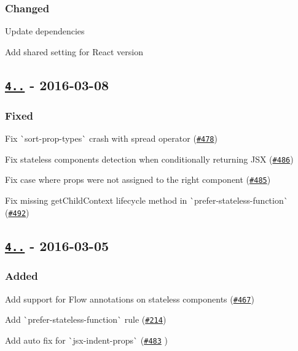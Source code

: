 \subsubsection*{Changed}


\begin{DoxyItemize}
\item Update dependencies
\item Add shared setting for React version
\end{DoxyItemize}

\subsection*{\href{https://github.com/yannickcr/eslint-plugin-react/compare/v4.2.0...v4.2.1}{\tt 4..} -\/ 2016-\/03-\/08}

\subsubsection*{Fixed}


\begin{DoxyItemize}
\item Fix \`{}sort-\/prop-\/types\`{} crash with spread operator (\href{https://github.com/yannickcr/eslint-plugin-react/issues/478}{\tt \#478})
\item Fix stateless components detection when conditionally returning J\+SX (\href{https://github.com/yannickcr/eslint-plugin-react/issues/486}{\tt \#486})
\item Fix case where props were not assigned to the right component (\href{https://github.com/yannickcr/eslint-plugin-react/issues/485}{\tt \#485})
\item Fix missing {\ttfamily get\+Child\+Context} lifecycle method in \`{}prefer-\/stateless-\/function\`{} (\href{https://github.com/yannickcr/eslint-plugin-react/issues/492}{\tt \#492})
\end{DoxyItemize}

\subsection*{\href{https://github.com/yannickcr/eslint-plugin-react/compare/v4.1.0...v4.2.0}{\tt 4..} -\/ 2016-\/03-\/05}

\subsubsection*{Added}


\begin{DoxyItemize}
\item Add support for Flow annotations on stateless components (\href{https://github.com/yannickcr/eslint-plugin-react/issues/467}{\tt \#467})
\item Add \`{}prefer-\/stateless-\/function\`{} rule (\href{https://github.com/yannickcr/eslint-plugin-react/issues/214}{\tt \#214})
\item Add auto fix for \`{}jsx-\/indent-\/props\`{} (\href{https://github.com/yannickcr/eslint-plugin-react/pull/483}{\tt \#483} )
\end{DoxyItemize}

